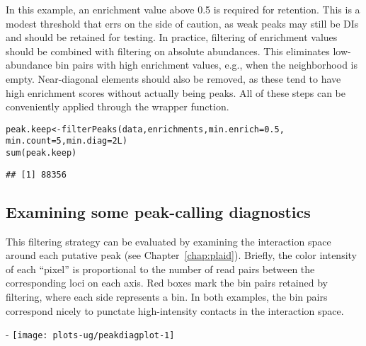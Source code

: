 \documentclass{report}\usepackage[]{graphicx}\usepackage[usenames,dvipsnames]{color}
\makeatletter
\def\maxwidth{ %
  \ifdim\Gin@nat@width>\linewidth
    \linewidth
  \else
    \Gin@nat@width
  \fi
}
\newcommand{\hlnum}[1]{\textcolor[rgb]{0.816,0.125,0.439}{#1}}%
\newcommand{\hlstd}[1]{\textcolor[rgb]{0.251,0.251,0.251}{#1}}%
\newcommand{\hlkwb}[1]{\textcolor[rgb]{0,0,0}{#1}}%
\newcommand{\hlkwc}[1]{\textcolor[rgb]{0.251,0.251,0.251}{#1}}%
\newcommand{\hlkwd}[1]{\textcolor[rgb]{0.878,0.439,0.125}{#1}}%
\newenvironment{knitrout}{}{} %
\makeatother
\begin{document}
In this example, an enrichment value above 0.5 is required for retention.
This is a modest threshold that errs on the side of caution, as weak peaks may still be DIs and should be retained for testing.
In practice, filtering of enrichment values should be combined with filtering on absolute abundances.
This eliminates low-abundance bin pairs with high enrichment values, e.g., when the neighborhood is empty.
Near-diagonal elements should also be removed, as these tend to have high enrichment scores without actually being peaks.
All of these steps can be conveniently applied through the  wrapper function.

\begin{knitrout}
\color{fgcolor}\begin{kframe}
\begin{alltt}
\hlstd{peak.keep} \hlkwb{<-} \hlkwd{filterPeaks}\hlstd{(data, enrichments,} \hlkwc{min.enrich}\hlstd{=}\hlnum{0.5}\hlstd{,}
                         \hlkwc{min.count}\hlstd{=}\hlnum{5}\hlstd{,} \hlkwc{min.diag}\hlstd{=}\hlnum{2L}\hlstd{)}
\hlkwd{sum}\hlstd{(peak.keep)}
\end{alltt}
\begin{verbatim}
## [1] 88356
\end{verbatim}
\end{kframe}
\end{knitrout}

\subsection{Examining some peak-calling diagnostics}
This filtering strategy can be evaluated by examining the interaction space around each putative peak (see Chapter~\ref{chap:plaid}).
Briefly, the color intensity of each ``pixel'' is proportional to the number of read pairs between the corresponding loci on each axis.
Red boxes mark the bin pairs retained by filtering, where each side represents a bin.
In both examples, the bin pairs correspond nicely to punctate high-intensity contacts in the interaction space.

\begin{knitrout}
\color{fgcolor}\begin{adjustwidth}{0mm}{-\fltoffset}
\texttt{[image: plots-ug/peakdiagplot-1]} \end{adjustwidth}
\end{knitrout}
\end{document}
